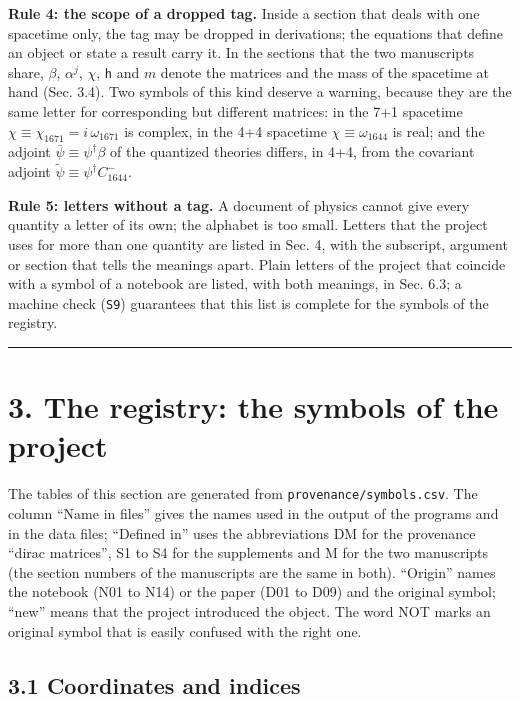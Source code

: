 \documentclass[
  10pt,
]{article}
\begin{document}
\textbf{Rule 4: the scope of a dropped tag.} Inside a section that deals
with one spacetime only, the tag may be dropped in derivations; the
equations that define an object or state a result carry it. In the
sections that the two manuscripts share, \(\beta\), \(\alpha^j\),
\(\chi\), \(\mathsf h\) and \(m\) denote the matrices and the mass of
the spacetime at hand (Sec. 3.4). Two symbols of this kind deserve a
warning, because they are the same letter for corresponding but
different matrices: in the 7+1 spacetime
\(\chi\equiv\chi_{1671}=i\,\omega_{1671}\) is complex, in the 4+4
spacetime \(\chi\equiv\omega_{1644}\) is real; and the adjoint
\(\bar\psi\equiv\psi^\dagger\beta\) of the quantized theories differs,
in 4+4, from the covariant adjoint
\(\tilde\psi\equiv\psi^\dagger C_{1644}^{-}\).

\textbf{Rule 5: letters without a tag.} A document of physics cannot
give every quantity a letter of its own; the alphabet is too small.
Letters that the project uses for more than one quantity are listed in
Sec. 4, with the subscript, argument or section that tells the meanings
apart. Plain letters of the project that coincide with a symbol of a
notebook are listed, with both meanings, in Sec. 6.3; a machine check
(\texttt{S9}) guarantees that this list is complete for the symbols of
the registry.

\begin{center}\rule{0.5\linewidth}{0.5pt}\end{center}

\hypertarget{the-registry-the-symbols-of-the-project}{%
\section{3. The registry: the symbols of the
project}\label{the-registry-the-symbols-of-the-project}}

The tables of this section are generated from
\texttt{provenance/symbols.csv}. The column ``Name in files'' gives the
names used in the output of the programs and in the data files;
``Defined in'' uses the abbreviations DM for the provenance ``dirac
matrices'', S1 to S4 for the supplements and M for the two manuscripts
(the section numbers of the manuscripts are the same in both).
``Origin'' names the notebook (N01 to N14) or the paper (D01 to D09) and
the original symbol; ``new'' means that the project introduced the
object. The word NOT marks an original symbol that is easily confused
with the right one.

\hypertarget{coordinates-and-indices}{%
\subsection{3.1 Coordinates and indices}\label{coordinates-and-indices}}
\end{document}
